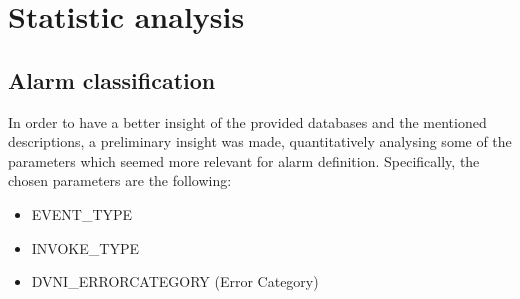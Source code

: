 \documentclass[a4paper,12pt]{article}
\begin{document}
\section{Statistic analysis}
\subsection{Alarm classification}
In order to have a better insight of the provided databases and the mentioned descriptions, a preliminary insight was made, quantitatively analysing some of the parameters which seemed more relevant for alarm definition. Specifically, the chosen parameters are the following:

\begin{itemize}
 \item EVENT\_TYPE
 \item INVOKE\_TYPE
 \item DVNI\_ERRORCATEGORY (Error Category)
\end{itemize}
\end{document}
